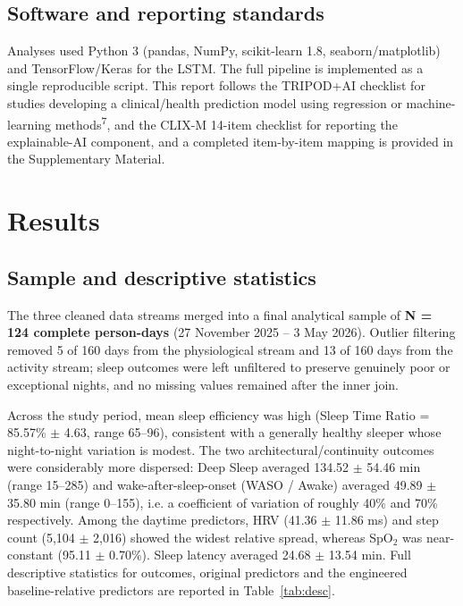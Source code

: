 \documentclass[fleqn,10pt]{wlscirep}
\begin{document}
\subsection*{Software and reporting standards}

Analyses used Python 3 (pandas, NumPy, scikit-learn 1.8, seaborn/matplotlib) and TensorFlow/Keras for the LSTM. The full pipeline is implemented as a single reproducible script. This report follows the TRIPOD+AI checklist for studies developing a clinical/health prediction model using regression or machine-learning methods\textsuperscript{7}, and the CLIX-M 14-item checklist for reporting the explainable-AI component, and a completed item-by-item mapping is provided in the Supplementary Material.

\section*{Results}

\subsection*{Sample and descriptive statistics}

The three cleaned data streams merged into a final analytical sample of \textbf{N = 124 complete person-days} (27 November 2025 -- 3 May 2026). Outlier filtering removed 5 of 160 days from the physiological stream and 13 of 160 days from the activity stream; sleep outcomes were left unfiltered to preserve genuinely poor or exceptional nights, and no missing values remained after the inner join.

Across the study period, mean sleep efficiency was high (Sleep Time Ratio = 85.57\% $\pm$ 4.63, range 65--96), consistent with a generally healthy sleeper whose night-to-night variation is modest. The two architectural/continuity outcomes were considerably more dispersed: Deep Sleep averaged 134.52 $\pm$ 54.46 min (range 15--285) and wake-after-sleep-onset (WASO / Awake) averaged 49.89 $\pm$ 35.80 min (range 0--155), i.e. a coefficient of variation of roughly 40\% and 70\% respectively. Among the daytime predictors, HRV (41.36 $\pm$ 11.86 ms) and step count (5{,}104 $\pm$ 2{,}016) showed the widest relative spread, whereas SpO$_2$ was near-constant (95.11 $\pm$ 0.70\%). Sleep latency averaged 24.68 $\pm$ 13.54 min. Full descriptive statistics for outcomes, original predictors and the engineered baseline-relative predictors are reported in Table~\ref{tab:desc}.
\end{document}
